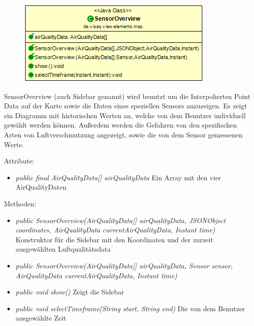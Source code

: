 \begin{minipage}{0.4\textwidth}
    \begin{figure}[H]
        \includegraphics[scale = 0.5]{media/frontend/view/de.view.elements.map/SensorOverview_Class.png}
    \end{figure}
    \end{minipage} \hfill
    \begin{minipage}{0.4\textwidth}
SensorOverview (auch Sidebar genannt) wird benutzt um die Interpolierten Point Data auf der Karte sowie die Daten eines speziellen Sensors anzuzeigen. Es zeigt ein Diagramm mit historischen Werten an, welche von dem Benutzer individuell gewählt werden können. Außerdem werden die Gefahren von den spezifischen Arten von Luftverschmutzung angezeigt, sowie die von dem Sensor gemessenen Werte.
\end{minipage}

Attribute:
\begin{itemize} 
    \item \emph{public final AirQualityData[] airQualityData} Ein Array mit den vier AirQualityDaten
\end{itemize}
Methoden:
\begin{itemize} 
    \item \emph{public SensorOverview(AirQualityData[] airQualityData, JSONObject coordinates, AirQualityData currentAirQualityData, Instant time)} Konstruktor für die Sidebar mit den Koordinaten und der zurzeit ausgewählten Luftqualitätsdata
    \item \emph{public SensorOverview(AirQualityData[] airQualityData, Sensor sensor, AirQualityData currentAirQualityData, Instant time)}
    \item \emph{public void show()} Zeigt die Sidebar
    \item \emph{public void selectTimeframe(String start, String end)} Die von dem Benutzer ausgewählte Zeit
\end{itemize}